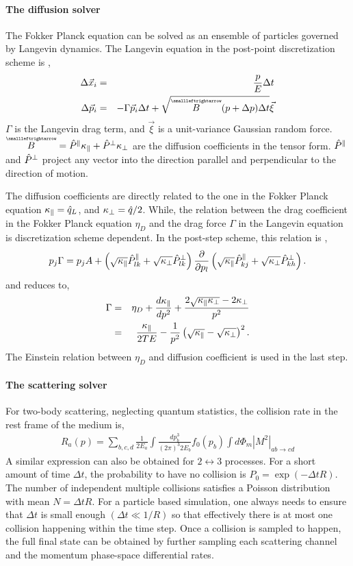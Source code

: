 \paragraph{The diffusion solver}
The Fokker Planck equation can be solved as an ensemble of particles governed by Langevin dynamics.
The Langevin equation in the post-point discretization scheme is \cite{He:2013zua},
\begin{eqnarray}
\Delta \vec{x}_i &=& \frac{p}{E}\Delta t\\
\Delta \vec{p}_i &=& -\Gamma \vec{p}_i \Delta t + \sqrt{\tensor{B}(p+\Delta p) \Delta t  }\vec{\xi}
\end{eqnarray}
$\Gamma$ is the Langevin drag term, and $\vec{\xi}$ is a unit-variance Gaussian random force.
$\tensor{B} = \Ppara \Kpara + \Pperp \Kperp$ are the diffusion coefficients in the tensor form.
$\hat{P}^{\|}$ and $\hat{P}^{\perp}$ project any vector into the direction parallel and perpendicular to the direction of motion.

The diffusion coefficients are directly related to the one in the Fokker Planck equation $\kappa_{\|} = \hat{q}_L$, and $\kappa_{\perp} = \hat{q}/2$.
While, the relation between the drag coefficient in the Fokker Planck equation $\eta_D$ and the drag force $\Gamma$ in the Langevin equation is discretization scheme dependent.
In the post-step scheme, this relation is  \cite{He:2013zua},
\begin{eqnarray}
p_j \Gamma  = p_jA + \left(\sqrt{\kappa_{\|}}\hat{P}^{\|}_{lk} + \sqrt{\kappa_{\perp}}\hat{P}^{\perp}_{lk}\right) \frac{\partial}{\partial p_l} \left( \sqrt{\kappa_{\|}}\hat{P}^{\|}_{kj} + \sqrt{\kappa_{\perp}}\hat{P}^{\perp}_{kh} \right).
\end{eqnarray}
and reduces to,
\begin{eqnarray}
\Gamma &=& \eta_D + \frac{d \kappa_{\|}}{dp^2} + \frac{2\sqrt{\kappa_{\|}\kappa_{\perp}} - 2\kappa_{\perp}}{p^2} \\
 &=& \frac{\kappa_{\|}}{2TE} - \frac{1}{p^2}\left( \sqrt{\kappa_{\|}} - \sqrt{\kappa_{\perp}} \right)^2.
\end{eqnarray}
The Einstein relation between $\eta_D$ and diffusion coefficient is used in the last step.

\paragraph{The scattering solver}
For two-body scattering, neglecting quantum statistics, the collision rate in the rest frame of the medium is,
\begin{eqnarray}
R_a(p) = \sum_{b,c,d}\frac{1}{2E_a}\int \frac{dp_b^3}{(2\pi)^3 2E_b} f_0(p_b) \int d\Phi_m |M^2|_{ab\rightarrow cd}
\end{eqnarray}
A similar expression can also be obtained for $2\leftrightarrow 3$ processes.
For a short amount of time $\Delta t$, the probability to have no collision is $P_{0} = \exp(-\Delta t R)$.
The number of independent multiple collisions satisfies a Poisson distribution with mean $N = \Delta t R$. 
For a particle based simulation, one always needs to ensure that $\Delta t$ is small enough $(\Delta t \ll 1/R)$ so that effectively there is at most one collision happening within the time step.
Once a collision is sampled to happen, the full final state can be obtained by further sampling each scattering channel and the momentum phase-space differential rates.

